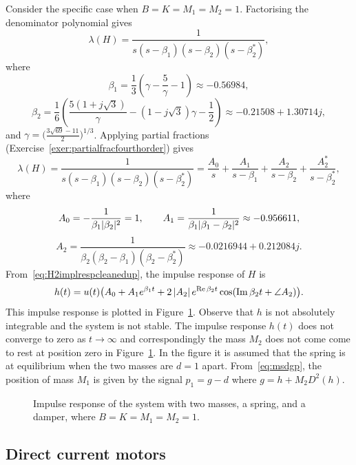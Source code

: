 Consider the specific case when $B=K=M_1=M_2=1$.  Factorising the denominator polynomial gives
\[
\lambda(H) = \frac{1}{s(s-\beta_1)(s-\beta_2)(s-\beta_2^*)},
\]
where 
\[
\beta_1 = \frac{1}{3}\left( \gamma - \frac{5}{\gamma} - 1 \right) \approx -0.56984,
\]
\[
\beta_2 = \frac{1}{6} \left( \frac{5(1+j\sqrt{3})}{\gamma}  - (1-j\sqrt{3})\gamma - \frac{1}{2} \right) \approx -0.21508 + 1.30714 j,
\]
and $\gamma = \big(\tfrac{3 \sqrt{69} - 11}{2}\big)^{1/3}$.  Applying partial fractions (Exercise~\ref{exer:partialfracfourthorder}) gives
\[
\lambda(H) = \frac{1}{s(s-\beta_1)(s-\beta_2)(s-\beta_2^*)} = \frac{A_0}{s} + \frac{A_1}{s-\beta_1} + \frac{A_2}{s-\beta_2} + \frac{A_2^*}{s-\beta_2^*},
\]
where 
\[
A_0 = -\frac{1}{\beta_1\vert \beta_2 \vert^2} = 1, \qquad A_1 =  \frac{1}{\beta_1\vert \beta_1 - \beta_2 \vert^2} \approx -0.956611, 
\]
\[
A_2 = \frac{1}{\beta_2(\beta_2-\beta_1)(\beta_2-\beta_2^*)} \approx -0.0216944 + 0.212084 j.
\]
From~\eqref{eq:H2implrespcleanedup}, the impulse response of $H$ is
\[
h(t) = u(t)\big( A_0 + A_1e^{\beta_1 t} + 2\left\vert A_2 \right\vert e^{\operatorname{Re}{\beta_2} t} \cos(\operatorname{Im}{\beta_2}t + \angle{A_2})  \big).
\]
This impulse response is plotted in Figure~\ref{fig:masspringdampertwoimpulseresponse}.  Observe that $h$ is not absolutely integrable and the system is not stable.  The impulse response $h(t)$ does not converge to zero as $t\to\infty$ and correspondingly the mass $M_2$ does not come come to rest at position zero in Figure~\ref{fig:masspringdampertwoimpulseresponse}.  In the figure it is assumed that the spring is at equilibrium when the two masses are $d = 1$ apart.  From~\eqref{eq:msdgp}, the position of mass $M_1$ is given by the signal $p_1 = g - d$ where $g = h + M_2D^2(h)$.

\begin{figure}[tp]
\centering
{}
\caption{Impulse response of the system with two masses, a spring, and a damper, where $B=K=M_1=M_2=1$.} \label{fig:masspringdampertwoimpulseresponse}
\end{figure}


\subsection{Direct current motors}\label{sec:direct-curr-motors-1}

